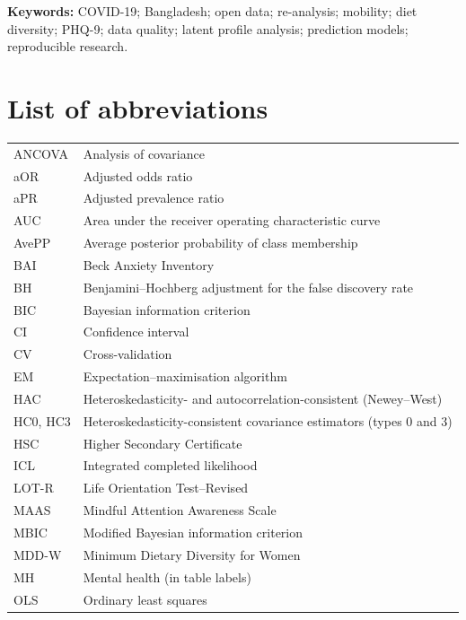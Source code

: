 \vspace{0.3cm}
\noindent\textbf{Keywords:} COVID-19; Bangladesh; open data; re-analysis; mobility; diet diversity; PHQ-9; data quality; latent profile analysis; prediction models; reproducible research.

\cleardoublepage
\tableofcontents
\cleardoublepage
\listoffigures
\cleardoublepage
\listoftables

\chapter*{List of abbreviations}
\begin{singlespace}
\begin{tabular}{@{}p{3cm}p{11cm}@{}}
ANCOVA & Analysis of covariance \\
aOR & Adjusted odds ratio \\
aPR & Adjusted prevalence ratio \\
AUC & Area under the receiver operating characteristic curve \\
AvePP & Average posterior probability of class membership \\
BAI & Beck Anxiety Inventory \\
BH & Benjamini--Hochberg adjustment for the false discovery rate \\
BIC & Bayesian information criterion \\
CI & Confidence interval \\
CV & Cross-validation \\
EM & Expectation--maximisation algorithm \\
HAC & Heteroskedasticity- and autocorrelation-consistent (Newey--West) \\
HC0, HC3 & Heteroskedasticity-consistent covariance estimators (types 0 and 3) \\
HSC & Higher Secondary Certificate \\
ICL & Integrated completed likelihood \\
LOT-R & Life Orientation Test--Revised \\
MAAS & Mindful Attention Awareness Scale \\
MBIC & Modified Bayesian information criterion \\
MDD-W & Minimum Dietary Diversity for Women \\
MH & Mental health (in table labels) \\
OLS & Ordinary least squares \\

\end{tabular}
\end{singlespace}
